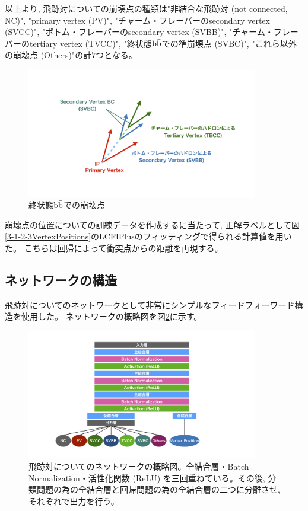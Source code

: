 以上より, 飛跡対についての崩壊点の種類は"非結合な飛跡対 (not connected, NC)", "primary vertex (PV)", "チャーム・フレーバーのsecondary vertex (SVCC)", "ボトム・フレーバーのsecondary vertex (SVBB)", "チャーム・フレーバーのtertiary vertex (TVCC)", "終状態$\rm b\bar{b}$での準崩壊点 (SVBC)", "これら以外の崩壊点 (Others)"の計$7$つとなる。

\begin{figure}[htbp]
 \centering
 \includegraphics[trim = 200 150 200 150, width=0.9\textwidth, clip]{Figure/3Networks/3-3-0-1SecondaryVertexBC.png}
 \caption{終状態$\rm b\bar{b}$での崩壊点}
 \label{3-3-0-1SecondaryVertexBC}
\end{figure}

崩壊点の位置についての訓練データを作成するに当たって, 正解ラベルとして図\ref{3-1-2-3VertexPositions}のLCFIPlusのフィッティングで得られる計算値を用いた。
こちらは回帰によって衝突点からの距離を再現する。


\subsection{ネットワークの構造} \label{Net:PM:StructureofPM}

飛跡対についてのネットワークとして非常にシンプルなフィードフォーワード構造を使用した。
ネットワークの概略図を図\ref{3-3-1-1PairModel}に示す。

\begin{figure}[htbp]
 \centering
 \includegraphics[trim = 200 50 200 50, width=0.9\textwidth, clip]{Figure/3Networks/3-3-1-1PairModel.png}
 \caption[飛跡対についてのネットワークの概略図]{飛跡対についてのネットワークの概略図。全結合層・Batch Normalization・活性化関数 (ReLU) を三回重ねている。その後, 分類問題の為の全結合層と回帰問題の為の全結合層の二つに分離させ, それぞれで出力を行う。}
 \label{3-3-1-1PairModel}
\end{figure}

